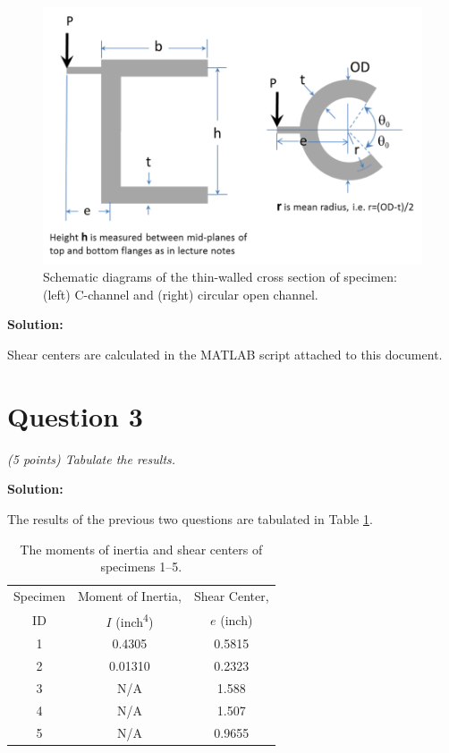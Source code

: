 \documentclass[12 pt]{article}
\begin{document}
\begin{figure}[htbp]
	\centering
	\includegraphics[width=6in]{images/Question 2 Figure}
	\caption{Schematic diagrams of the thin-walled cross section of specimen: (left) C-channel and (right) circular open channel.}
	\label{fig:question_2_fig}
\end{figure}

\textbf{Solution:}

Shear centers are calculated in the MATLAB script attached to this document.

\section*{Question 3}
\textit{(\num{5} points) Tabulate the results.}

\textbf{Solution:}

The results of the previous two questions are tabulated in Table \ref{tbl:question_3_table}.

\begin{table}[!htbp]
\caption{The moments of inertia and shear centers of specimens \num{1}--\num{5}.}
\begin{center}
	\begin{tabular}{|c|c|c|}
		\hline
		Specimen &Moment of Inertia, &Shear Center, \\
		ID&$I$ (\unit{inch^4})&$e$ (\unit{inch})\\
		\hline
		1&\num{0.4305}&\num{0.5815}\\
		\hline
		2&\num{0.01310}&\num{0.2323}\\
		\hline
		3&N/A&\num{1.588}\\
		\hline
		4&N/A&\num{1.507}\\
		\hline
		5&N/A&\num{0.9655}\\
		\hline
	\end{tabular}
\end{center}
\label{tbl:question_3_table}
\end{table}
\end{document}
